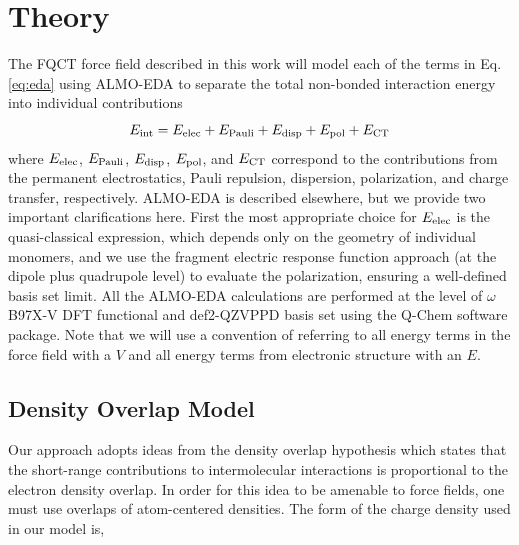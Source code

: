 \documentclass[journal=jctcce,manuscript=article]{achemso}
\begin{document}
\section*{Theory}
The FQCT force field described in this work will model each of the terms in Eq. \ref{eq:eda} using ALMO-EDA to separate the total non-bonded interaction energy into individual contributions\cite{khaliullin2007,horn2016probing}
\begin{equation}
E_{\rm int} = E_{\rm elec} + E_{\rm Pauli} + E_{\rm disp} + E_{\rm pol} +  E_{\rm CT}
 \label{eq:eda}
\end{equation}
where $E_{\rm elec}$, $E_{\rm Pauli}$, $ E_{\rm disp}$, $E_{\rm pol}$, and  $E_{\rm CT}$ correspond to the contributions from the permanent electrostatics, Pauli repulsion, dispersion, polarization, and charge transfer, respectively. ALMO-EDA is described elsewhere\cite{khaliullin2007,horn2016probing}, but we provide two important clarifications here. First the most appropriate choice for $E_{\rm elec}$ is the quasi-classical expression, which depends only on the geometry of individual monomers\cite{mao2017energy}, and we use the fragment electric response function approach (at the dipole plus quadrupole level) to evaluate the  polarization, ensuring a well-defined basis set limit.\cite{horn2015} All the ALMO-EDA calculations are performed at the level of $\omega$B97X-V DFT functional\cite{Mardirossian2014} and def2-QZVPPD basis set\cite{rappoport2010property} using the Q-Chem software package\cite{Epifanovsky2021}. Note that we will use a convention of referring to all energy terms in the force field with a $V$ and all energy terms from electronic structure
with an $E$. 

\subsection*{Density Overlap Model}
Our approach adopts ideas from the density overlap hypothesis\cite{kim1981dependence,wheatley1990overlap,gavezzotti2002calculation,van2016beyond,van2018new}
which states that the short-range contributions to intermolecular interactions is proportional to the electron density overlap. In order for this idea to be amenable to force fields, one must use overlaps of atom-centered
densities. The form of the charge density used in our model is,
\end{document}
